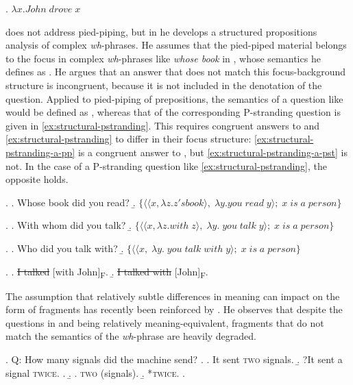 \ex. $\lambda x. John\;drove\;x$

\citet{reich2002a} does not address pied-piping, but in \citet{reich2002} he develops a structured propositions analysis of complex \textit{wh}-phrases. He assumes that the pied-piped material belongs to the focus in complex \textit{wh}-phrases like \textit{whose book} in \Next[a], whose semantics he defines as \Next[b]. He argues that an answer that does not match this focus-background structure is incongruent, because it is not included in the denotation of the question. Applied to pied-piping of prepositions, the semantics of a question like \NNext[a] would be defined as \NNext[b], whereas that of the corresponding P-stranding question is given in \ref{ex:structural-pstranding}. This requires congruent answers to \NNext and \ref{ex:structural-pstranding} to differ in their focus structure: \ref{ex:structural-pstranding-a-pp} is a congruent answer to \NNext, but \ref{ex:structural-pstranding-a-pst} is not. In the case of a P-stranding question like \ref{ex:structural-pstranding}, the opposite holds.

\newpage
\ex. \a. Whose book did you read?\hfill\citep{reich2002}
    \b. $\{\langle\langle x, \lambda z . z's book \rangle ,\;\lambda y . you\;read\;y \rangle;\; x \; is \; a \; person\}$
    
\ex. \a. With whom did you talk?
    \b. $\{\langle\langle x, \lambda z . with\; z \rangle ,\;\lambda y.\; you\;talk\;y \rangle;\; x \; is \; a \; person\}$

\ex. \label{ex:structural-pstranding}
\a. Who did you talk with?
    \b. $\{\langle\langle x,\;\lambda y.\; you\;talk\;with\;y \rangle;\; x \; is \; a \; person\}$

\ex. \a. \sout{I talked} [with John]\textsubscript{\textsc{F}}.\label{ex:structural-pstranding-a-pp}
     \b.  \sout{I talked with} [John]\textsubscript{\textsc{F}}.\label{ex:structural-pstranding-a-pst}

The assumption that relatively subtle differences in meaning can impact on the form of fragments has recently been reinforced by \citet{weir2018}. He observes that despite the questions in \Next and \NNext being relatively meaning-equivalent, fragments that do not match the semantics of the \textit{wh}-phrase are heavily degraded.\largerpage

\ex. \label{ex:weir-qa-ex1}
 Q: How many signals did the machine send? \hfill \citep[1289]{weir2018}
\a.  \a. It sent \textsc{two} signals.
\b. ?It sent a signal \textsc{twice}.
\z.
\b. \a. \textsc{two} (signals).
\b. *\textsc{twice}.
\z.

